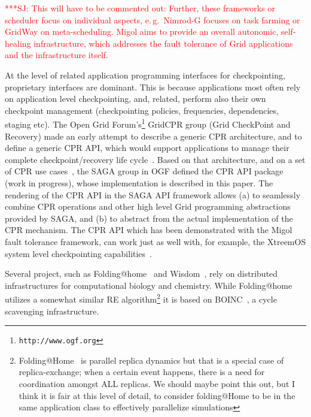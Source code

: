 \documentclass[times, 10pt, twocolumn]{article}
\newcommand{\jhanote}[1]{ {\textcolor{red} { ***SJ: #1 }}}
\newcommand{\jhanote}[1]{}
\newcommand{\up}{\vspace*{-1em}}
\begin{document}
\jhanote{This will have to be commented out: Further, these frameworks
  or scheduler focus on individual aspects, e.\,g.\ Nimrod-G focuses
  on task farming or GridWay on meta-scheduling. Migol aims to provide
  an overall autonomic, self-healing infrastructure, which addresses
  the fault tolerance of Grid applications and the infrastructure
  itself.}

At the level of related application programming interfaces for
checkpointing, proprietary interfaces are dominant. This is because
applications most often rely on application level checkpointing, and,
related, perform also their own checkpoint management (checkpointing
policies, frequencies, dependencies, staging etc).  The Open Grid
Forum's\footnote{\texttt{http://www.ogf.org}} GridCPR group (Grid
CheckPoint and Recovery) made an early attempt to describe a generic
CPR architecture, and to define a generic CPR API, which would support
applications to manage their complete checkpoint/recovery life
cycle~\cite{ogf_cpr_arch}.  Based on that architecture, and on a set
of CPR use cases~\cite{ogf_cpr_uc}, the SAGA group in OGF defined the
CPR API package~\cite{saga_cpr_draft} (work in progress), whose
implementation is described in this paper.  The rendering of the CPR
API in the SAGA API framework allows (a) to seamlessly combine CPR
operations and other high level Grid programming abstractions provided
by SAGA, and (b) to abstract from the actual implementation of the CPR
mechanism.  The CPR API which has been demonstrated with the Migol
fault tolerance framework, can work just as well with, for example,
the XtreemOS system level checkpointing
capabilities~\cite{xtreemos_cpr}.



\up
Several project, such as Folding@home~\cite{folding} and
Wisdom~\cite{wisdom}, rely on distributed infrastructures for
computational biology and chemistry. While
Folding@home~\cite{PhysRevLett.86.4983} utilizes a somewhat similar RE
algorithm\footnote{Folding@Home~\cite{PhysRevLett.86.4983} is parallel
  replica dynamics but that is a special case of replica-exchange;
  when a certain event happens, there is a need for coordination
  amongst ALL replicas. We should maybe point this out, but I think it
  is fair at this level of detail, to consider folding@Home to be in
  the same application class to effectively parallelize simulations}
it is based on BOINC~\cite{1033223}, a cycle scavenging
infrastructure.
\end{document}
